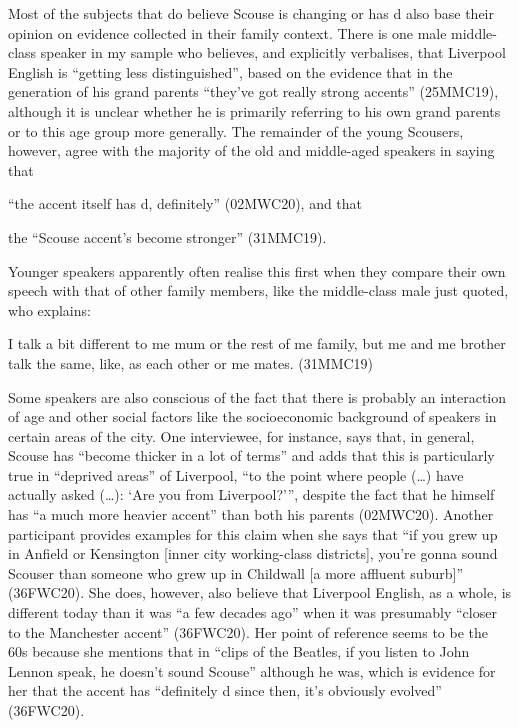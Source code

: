 Most of the subjects that do believe Scouse is changing or has d also base their opinion on evidence collected in their family context.
There is one male middle-class speaker in my sample who believes, and explicitly verbalises, that Liverpool English is ``getting less distinguished'', based on the evidence that in the generation of his grand parents ``they've got really strong accents'' (25MMC19), although it is unclear whether he is primarily referring to his own grand parents or to this age group more generally.
The remainder of the young Scousers, however, agree with the majority of the old and middle-aged speakers in saying that
\begin{inparaenum}[(a)]
	\item ``the accent itself has d, definitely'' (02MWC20), and that
	\item the ``Scouse accent's become stronger'' (31MMC19).
\end{inparaenum}
Younger speakers apparently often realise this first when they compare their own speech with that of other family members, like the middle-class male just quoted, who explains:
\begin{example}
	I talk a bit different to me mum or the rest of me family, but me and me brother talk the same, like, as each other or me mates. (31MMC19)
\end{example}

Some speakers are also conscious of the fact that there is probably an interaction of age and other social factors like the socioeconomic background of speakers in certain areas of the city.
One interviewee, for instance, says that, in general, Scouse has ``become thicker in a lot of terms'' and adds that this is particularly true in ``deprived areas'' of Liverpool, ``to the point where people (\ldots) have actually asked (\ldots): `Are you from Liverpool?''', despite the fact that he himself has ``a much more heavier accent'' than both his parents (02MWC20).
Another participant provides examples for this claim when she says that ``if you grew up in Anfield or Kensington [inner city working-class districts], you're gonna sound Scouser than someone who grew up in Childwall [a more affluent suburb]'' (36FWC20).
She does, however, also believe that Liverpool English, as a whole, is different today than it was ``a few decades ago'' when it was presumably ``closer to the Manchester accent'' (36FWC20).
Her point of reference seems to be the 60s because she mentions that in ``clips of the Beatles, if you listen to John Lennon speak, he doesn't sound Scouse'' although he was, which is evidence for her that the accent has ``definitely d since then, it's obviously evolved'' (36FWC20).

